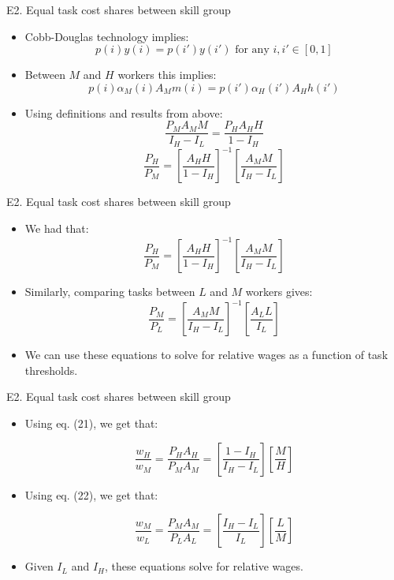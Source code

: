 \documentclass[notes=show]{beamer}
\begin{document}
\begin{frame}{E2. Equal task cost shares between skill group}
\begin{itemize}
\item Cobb-Douglas technology implies:
\[
p(i)y(i) = p(i')y(i') \text{ for any } i,i' \in [0,1] \tag{17} \label{eq17}
\]
\item Between $M$ and $H$ workers this implies:
\[
p(i) \alpha_{M}(i) A_{M} m(i) = p(i') \alpha_{H}(i') A_{H} h(i')
\]
\item Using definitions and results from above:
\[
\frac{P_{M}A_{M}M}{I_{H} - I_{L}} = \frac{P_{H}A_{H}H}{1 - I_{H}}
\]
\[
\frac{P_{H}}{P_{M}} = \left[\frac{A_{H}H}{1 - I_{H}}\right] ^{-1} \left[\frac{A_{M}M}{I_{H} - I_{L}} \right] \tag{21} \label{eq21}
\]
\end{itemize}
\end{frame}

\begin{frame}{E2. Equal task cost shares between skill group}
\begin{itemize}
\item We had that:
\[
\frac{P_{H}}{P_{M}} = \left[\frac{A_{H}H}{1 - I_{H}}\right] ^{-1} \left[\frac{A_{M}M}{I_{H} - I_{L}} \right] \tag{21} \label{eq21}
\]
\item Similarly, comparing tasks between $L$ and $M$ workers gives:
\[
\frac{P_{M}}{P_{L}} = \left[\frac{A_{M}M}{I_{H} - I_{L}}\right] ^{-1} \left[\frac{A_{L}L}{I_{L}} \right] \tag{22} \label{eq22}
\]
\item We can use these equations to solve for relative wages as a function of task thresholds.
\end{itemize}
\end{frame}

\begin{frame}{E2. Equal task cost shares between skill group}
\begin{itemize}
\item Using eq. (21), we get that:
\begin{tcolorbox}
\[
\frac{w_{H}}{w_{M}} = \frac{P_{H}A_{H}}{P_{M}A_{M}} = \left[\frac{1-I_{H}}{I_{H}-I_{L}} \right] \left[ \frac{M}{H} \right] \tag{26} \label{eq26}
\]
\end{tcolorbox}
\item Using eq. (22), we get that:
\begin{tcolorbox}
\[
\frac{w_{M}}{w_{L}} = \frac{P_{M}A_{M}}{P_{L}A_{L}} = \left[\frac{I_{H}-I_{L}}{I_{L}} \right] \left[ \frac{L}{M} \right] \tag{27} \label{eq27}
\]
\end{tcolorbox}
\item Given $I_{L}$ and $I_{H}$, these equations solve for relative wages.
\end{itemize}
\end{frame}
\end{document}

